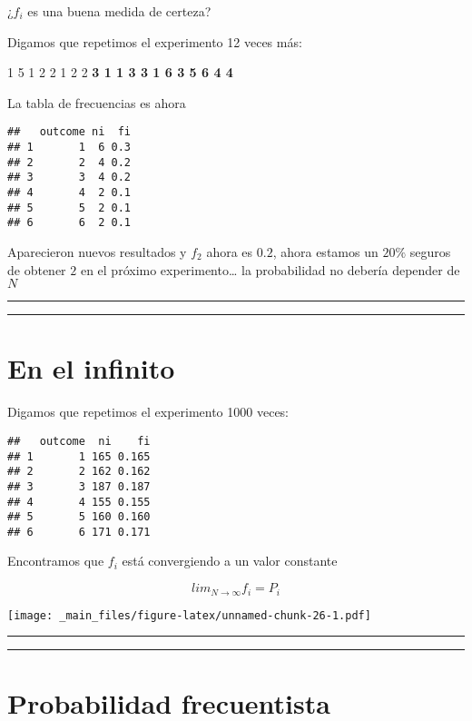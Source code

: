 \documentclass[
]{book}
\begin{document}
¿\(f_i\) es una buena medida de certeza?

Digamos que repetimos el experimento 12 veces más:

1 5 1 2 2 1 2 2 \textbf{3 1 1 3 3 1 6 3 5 6 4 4}

La tabla de frecuencias es ahora

\begin{verbatim}
##   outcome ni  fi
## 1       1  6 0.3
## 2       2  4 0.2
## 3       3  4 0.2
## 4       4  2 0.1
## 5       5  2 0.1
## 6       6  2 0.1
\end{verbatim}

Aparecieron nuevos resultados y \(f_2\) ahora es \(0.2\), ahora estamos un \(20\%\) seguros de obtener \(2\) en el próximo experimento\ldots{} la probabilidad no debería depender de \(N\)

\begin{center}\rule{0.5\linewidth}{0.5pt}\end{center}

\begin{center}\rule{0.5\linewidth}{0.5pt}\end{center}

\hypertarget{en-el-infinito}{%
\section{En el infinito}\label{en-el-infinito}}

Digamos que repetimos el experimento 1000 veces:

\begin{verbatim}
##   outcome  ni    fi
## 1       1 165 0.165
## 2       2 162 0.162
## 3       3 187 0.187
## 4       4 155 0.155
## 5       5 160 0.160
## 6       6 171 0.171
\end{verbatim}

Encontramos que \(f_i\) está convergiendo a un valor constante

\[lim_{N\rightarrow \infty} f_i = P_i\]

\texttt{[image: \_main\_files/figure-latex/unnamed-chunk-26-1.pdf]}

\begin{center}\rule{0.5\linewidth}{0.5pt}\end{center}

\begin{center}\rule{0.5\linewidth}{0.5pt}\end{center}

\hypertarget{probabilidad-frecuentista}{%
\section{Probabilidad frecuentista}\label{probabilidad-frecuentista}}
\end{document}

